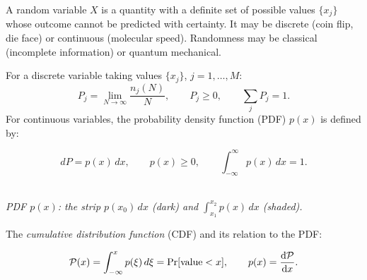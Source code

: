 \begin{definition}
A random variable $X$ is a quantity with a definite set of possible values $\{x_j\}$ whose outcome cannot be predicted with certainty. It may be discrete (coin flip, die face) or continuous (molecular speed). Randomness may be classical (incomplete information) or quantum mechanical.
\end{definition}

For a discrete variable taking values $\{x_j\}$, $j = 1,\ldots,M$:
\begin{equation}
    P_j = \lim_{N\to\infty} \frac{n_j(N)}{N}, \qquad P_j \ge 0, \qquad \sum_j P_j = 1.
\end{equation}
For continuous variables, the probability density function (PDF) $p(x)$ is defined by:
\begin{definition}
\begin{equation}
    dP = p(x)\,dx, \qquad p(x) \ge 0, \qquad \int_{-\infty}^\infty p(x)\,dx = 1.
\end{equation}
\end{definition}

\begin{center}
\\[3pt]
{\small\itshape PDF $p(x)$: the strip $p(x_0)\,dx$ (dark) and $\int_{x_1}^{x_2} p(x)\,dx$ (shaded).}
\end{center}

The \emph{cumulative distribution function} (CDF) and its relation to the PDF:
\begin{definition}[CDF]
\begin{equation}
    \mathcal{P}(x) = \int_{-\infty}^{x} p(\xi)\,d\xi = \Pr[\text{value} < x], \qquad p(x) = \dv{\mathcal{P}}{x}.
\end{equation}
\end{definition}

